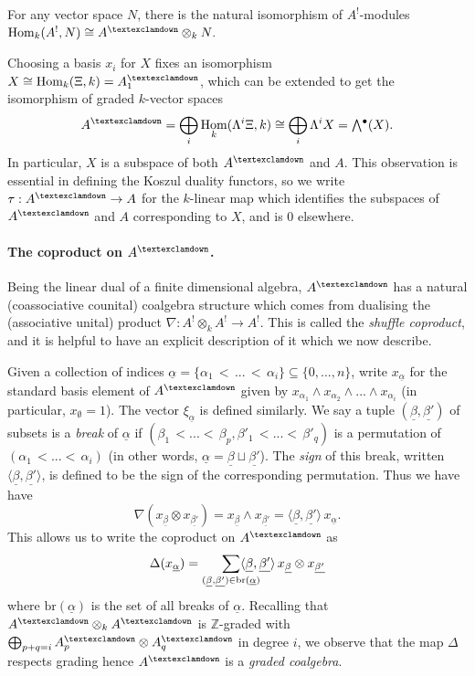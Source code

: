 \documentclass[a4paper]{article}
\theoremstyle{definition}
\theoremstyle{remark}
\newcommand{\Exter}{\mathchoice{{\textstyle\bigwedge}}%
    {{\bigwedge}}%
    {{\textstyle\wedge}}%
    {{\scriptstyle\wedge}}}
\DeclareMathOperator{\exterior}{\Exter^\bullet}
\DeclareMathOperator{\Hom}{\text{Hom}}
\newcommand{\gnab}{{\textexclamdown}}
\begin{document}
For any vector space \(N\), there is the natural isomorphism of
\(A^!\)-modules \({\Hom_{k}(A^!, N)\cong A^\gnab \otimes_k N}.\)  

Choosing a basis \(x_i\) for \(X\) fixes an isomorphism \(X\cong\Hom_k(\Xi,
k)=A^\gnab_1\), which can be extended to get the isomorphism of graded \(k\)-vector
spaces
\[A^\gnab = \bigoplus_i \Hom_k(\Lambda^i\Xi, k) \cong \bigoplus_i \Lambda^i X =
\exterior(X).\] 
In particular, \(X\) is a subspace of both \(A^\gnab\) and \(A\). This
observation is essential in defining the Koszul duality functors, so we write
\(\tau:A^\gnab \rightarrow A\) for the \(k\)-linear map which identifies the
subspaces of \(A^\gnab\) and \(A\) corresponding to \(X\), and is \(0\) elsewhere. 

\paragraph{The coproduct on \(A^\gnab\).}
Being the linear dual of a finite dimensional algebra, \(A^\gnab\) has a natural
(coassociative counital) coalgebra structure which comes from dualising the
(associative unital) product \({\nabla: A^!\otimes_k A^!\rightarrow A^!}\). This
is called the \textit{shuffle coproduct}, and it is helpful to have an explicit
description of it which we now describe. 

Given a collection of indices \(\underline{\alpha}=\{\alpha_1\,<\,
...\,<\,\alpha_i\}\subseteq \{0,...,n\}\), write \(x_{\underline{\alpha}}\) for the
standard basis element of \(A^\gnab\) given by \({x_{\alpha_1}\wedge
x_{\alpha_2} \wedge ... \wedge x_{\alpha_i}}\) (in particular,
\(x_\emptyset = 1\)). The vector \(\xi_{\underline{\alpha}}\) is defined
similarly. We say a tuple \((\underline{\beta}, \underline{\beta'})\) of subsets
is a \textit{break} of \(\underline{\alpha}\) if \((\beta_1\,<...<\,\beta_p,
\beta'_1\,<...<\,\beta'_q)\) is a permutation of \((\alpha_1\,<...<\,
\alpha_i)\) (in other words, \(\underline{\alpha} = \underline{\beta} \sqcup
\underline{\beta'}\)). The \textit{sign} of this break, written \(\langle
\underline{\beta}, \underline{\beta'}\rangle\), is defined to be the sign of the
corresponding permutation. Thus we have have 
\[\nabla(x_{\underline{\beta}} \otimes
    x_{\underline{\beta'}})=x_{\underline{\beta}} \wedge
    x_{\underline{\beta'}}=\langle \underline{\beta}, \underline{\beta'}\rangle
\, x_{\underline{\alpha}}.\] 
This allows us to write the coproduct on \(A^\gnab\) as 
\[\Delta(x_{\underline{\alpha}}) =
    \smashoperator[r]{\sum\limits_{(\underline{\beta},\underline{\beta'})\in
    \text{br}(\underline{\alpha})}} \langle \underline{\beta},
\underline{\beta'}\rangle \, x_{\underline{\beta}} \otimes
x_{\underline{\beta'}}\]
where \(\text{br}(\underline{\alpha})\) is the set of all breaks of
\(\underline{\alpha}\).  Recalling that \(A^\gnab\otimes_k A^\gnab\) is
\(\mathbb{Z}\)-graded with \(\bigoplus_{p+q=i}A^\gnab_p\otimes A^\gnab_q\) in
degree \(i\), we observe that the map \(\Delta\) respects grading hence
\(A^\gnab\) is a \textit{graded coalgebra}.
\end{document}
